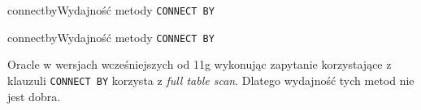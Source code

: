 



\begin{qxtab}{connectby}{Wydajność metody \texttt{CONNECT BY}}
\end{qxtab}

\begin{qxfig}{connectby}{Wydajność metody \texttt{CONNECT BY}}
\end{qxfig}


Oracle w wersjach wcześniejszych od 11g wykonując zapytanie korzystające
z klauzuli \texttt{CONNECT BY} korzysta z \emph{full table scan}.
Dlatego wydajność tych metod nie jest dobra.




%
%
%











